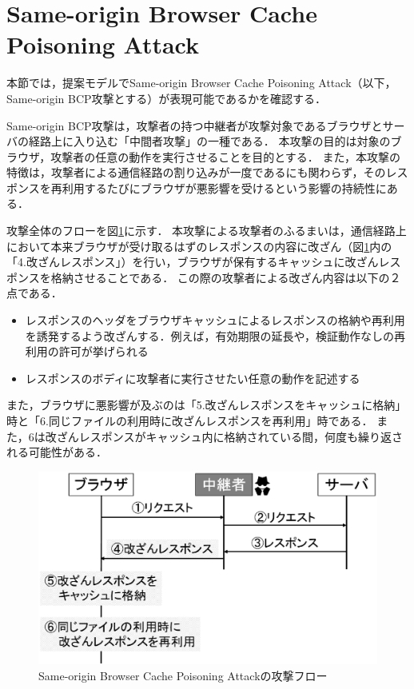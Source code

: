 \documentclass[12pt,a4paper]{jbook}
\begin{document}
\section{Same-origin Browser Cache Poisoning Attack}
\label{sec:same-origin-bcp}
本節では，提案モデルでSame-origin Browser Cache Poisoning Attack\cite{bcpattack}（以下，Same-origin BCP攻撃とする）が表現可能であるかを確認する．

Same-origin BCP攻撃は，攻撃者の持つ中継者が攻撃対象であるブラウザとサーバの経路上に入り込む「中間者攻撃」の一種である．
本攻撃の目的は対象のブラウザ，攻撃者の任意の動作を実行させることを目的とする．
また，本攻撃の特徴は，攻撃者による通信経路の割り込みが一度であるにも関わらず，そのレスポンスを再利用するたびにブラウザが悪影響を受けるという影響の持続性にある．

攻撃全体のフローを図\ref{fig:SameBCP_flow}に示す．
本攻撃による攻撃者のふるまいは，通信経路上において本来ブラウザが受け取るはずのレスポンスの内容に改ざん（図\ref{fig:SameBCP_flow}内の「4.改ざんレスポンス」）を行い，ブラウザが保有するキャッシュに改ざんレスポンスを格納させることである．
この際の攻撃者による改ざん内容は以下の２点である．
\begin{itemize}
\item レスポンスのヘッダをブラウザキャッシュによるレスポンスの格納や再利用を誘発するよう改ざんする．例えば，有効期限の延長や，検証動作なしの再利用の許可が挙げられる
\item レスポンスのボディに攻撃者に実行させたい任意の動作を記述する
\end{itemize}
また，ブラウザに悪影響が及ぶのは「5.改ざんレスポンスをキャッシュに格納」時と「6.同じファイルの利用時に改ざんレスポンスを再利用」時である．
また，6は改ざんレスポンスがキャッシュ内に格納されている間，何度も繰り返される可能性がある．

\begin{figure}[htb]
\centering
\includegraphics[width=400pt]{./fig/SameBCP_flow.eps}
\caption{Same-origin Browser Cache Poisoning Attackの攻撃フロー}
\label{fig:SameBCP_flow}
\end{figure}
\end{document}
